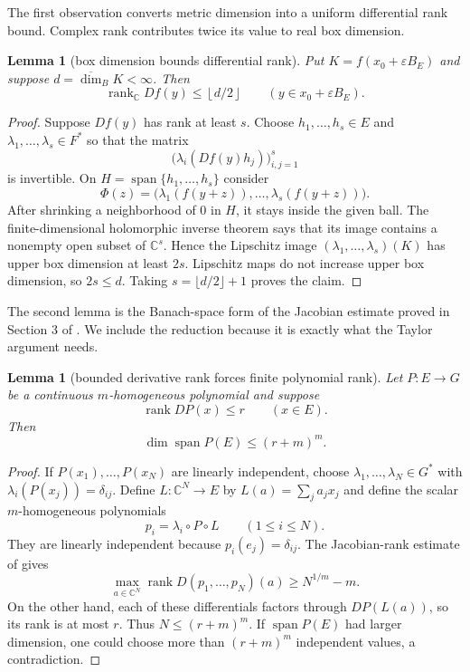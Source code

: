 \documentclass[11pt]{article}
\newtheorem{lemma}[theorem]{Lemma}
\newcommand{\C}{\mathbb C}
\newcommand{\Span}{\operatorname{span}}
\newcommand{\rank}{\operatorname{rank}}
\newcommand{\udim}{\overline{\dim}_{B}}
\begin{document}
The first observation converts metric dimension into a uniform differential
rank bound.  Complex rank contributes twice its value to real box dimension.

\begin{lemma}[box dimension bounds differential rank]\label{metricrank}
Put $K=f(x_0+\varepsilon B_E)$ and suppose $d=\udim K<\infty$.  Then
\[
 \rank_{\C}Df(y)\le \left\lfloor d/2\right\rfloor
 \qquad(y\in x_0+\varepsilon B_E).
\]
\end{lemma}

\begin{proof}
Suppose $Df(y)$ has rank at least $s$.  Choose $h_1,\ldots,h_s\in E$ and
$\lambda_1,\ldots,\lambda_s\in F^*$ so that the matrix
\[
 \bigl(\lambda_i(Df(y)h_j)\bigr)_{i,j=1}^s
\]
is invertible.  On $H=\Span\{h_1,\ldots,h_s\}$ consider
\[
 \Phi(z)=\bigl(\lambda_1(f(y+z)),\ldots,
                   \lambda_s(f(y+z))\bigr).
\]
After shrinking a neighborhood of $0$ in $H$, it stays inside the given
ball.  The finite-dimensional holomorphic inverse theorem says that its image
contains a nonempty open subset of $\C^s$.  Hence the Lipschitz image
$(\lambda_1,\ldots,\lambda_s)(K)$ has upper box dimension at least $2s$.
Lipschitz maps do not increase upper box dimension, so $2s\le d$.  Taking
$s=\lfloor d/2\rfloor+1$ proves the claim.
\end{proof}

The second lemma is the Banach-space form of the Jacobian estimate proved in
Section 3 of \cite{CDTT}.  We include the reduction because it is exactly what
the Taylor argument needs.

\begin{lemma}[bounded derivative rank forces finite polynomial rank]
\label{polyrank}
Let $P:E\to G$ be a continuous $m$-homogeneous polynomial and suppose
\[
 \rank DP(x)\le r\qquad(x\in E).
\]
Then
\[
 \dim\Span P(E)\le(r+m)^m.
\]
\end{lemma}

\begin{proof}
If $P(x_1),\ldots,P(x_N)$ are linearly independent, choose
$\lambda_1,\ldots,\lambda_N\in G^*$ with
$\lambda_i(P(x_j))=\delta_{ij}$.  Define $L:\C^N\to E$ by
$L(a)=\sum_j a_jx_j$ and define the scalar $m$-homogeneous polynomials
\[
 p_i=\lambda_i\circ P\circ L\qquad(1\le i\le N).
\]
They are linearly independent because $p_i(e_j)=\delta_{ij}$.  The
Jacobian-rank estimate of \cite[Corollary 3.3]{CDTT} gives
\[
 \max_{a\in\C^N}\rank D(p_1,\ldots,p_N)(a)
 \ge N^{1/m}-m.
\]
On the other hand, each of these differentials factors through $DP(L(a))$,
so its rank is at most $r$.  Thus $N\le(r+m)^m$.  If $\Span P(E)$ had larger
dimension, one could choose more than $(r+m)^m$ independent values, a
contradiction.
\end{proof}
\end{document}
